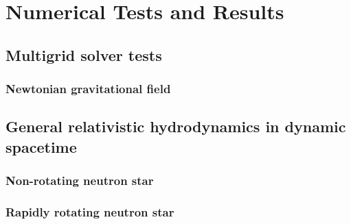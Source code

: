 
\chapter{Numerical Tests and Results}  %

\ifpdf
    \graphicspath{{Chapter4/Figs/PDF/}{Chapter4/Figs/}}
\else
    \graphicspath{{Chapter4/Figs/}}
\fi


\section{Multigrid solver tests} %
\label{section4.1}
\subsection{Newtonian gravitational field}

\section{General relativistic hydrodynamics in dynamic spacetime} %
\label{section4.2}
\subsection{Non-rotating neutron star}
\subsection{Rapidly rotating neutron star}

